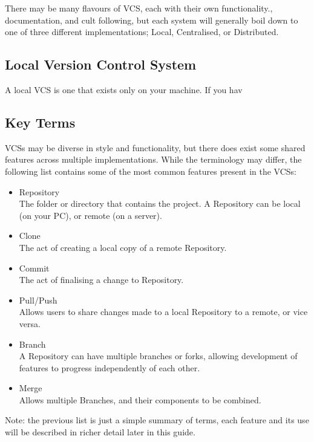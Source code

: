 \documentclass[11pt, a4paper, draft, titlepage]{article}
\begin{document}
There may be many flavours of VCS, each with their own functionality.,
documentation, and cult following, but each system will generally boil down to
one of three different implementations; Local, Centralised, or Distributed.

\subsection{Local Version Control System}
A local VCS is one that exists only on your machine. If you hav

\subsection{Key Terms} 
VCSs may be diverse in style and functionality, but there does exist some
shared features across multiple implementations. 
While the terminology may differ, the following list contains some of the most
common features present in the VCSs:

\begin{itemize} 
\item Repository \\ The folder or directory that contains the
project.  A Repository can be local (on your PC), or remote (on a server).
\item Clone \\ The act of creating a local copy of a remote Repository.  
\item Commit \\ The act of finalising a change to Repository.  
\item Pull/Push \\ Allows users to share changes made to a local Repository to
a remote, or vice versa.  
\item Branch \\ A Repository can have multiple branches or forks,
allowing development of features to progress independently of each other.
\item Merge \\ Allows multiple Branches, and their components to be combined.
\end{itemize}

Note: the previous list is just a simple summary of terms, each feature and
its use will be described in richer detail later in this guide.
\end{document}
